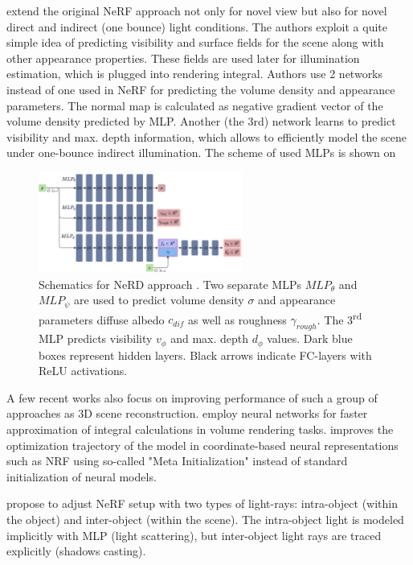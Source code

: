 \documentclass[english]{article}
\begin{document}
\cite{srinivasan2020nerv} extend the original NeRF approach not only for novel view but also for novel direct and indirect (one bounce) light conditions. The authors exploit a quite simple idea of predicting visibility and surface fields for the scene along with other appearance properties. These fields are used later for illumination estimation, which is plugged into rendering integral. Authors use 2 networks instead of one used in NeRF for predicting the volume density and appearance parameters. The normal map is calculated as negative gradient vector of the volume density predicted by MLP. Another (the 3rd) network learns to predict visibility and max. depth information, which allows to efficiently model the scene under one-bounce indirect illumination. The scheme of used MLPs is shown on 

\begin{figure}[t]
    \centering
    \includegraphics[width=0.6\textwidth]{img/mlp_nerv.png}
    \caption{Schematics for NeRD approach \cite{srinivasan2020nerv}. Two separate MLPs $MLP_\theta$ and $MLP_\psi$ are used to predict volume density $\sigma$ and appearance parameters diffuse albedo $c_{dif}$ as well as roughness $\gamma_{rough}$. The 3\textsuperscript{rd} MLP predicts visibility $v_\phi$ and max. depth $d_\phi$ values. Dark blue boxes represent hidden layers. Black arrows indicate FC-layers with ReLU activations.}
    \label{fig:mlp_nerv}
\end{figure}

A few recent works also focus on improving performance of such a group of approaches as 3D scene reconstruction. \cite{lindell2020autoint} employ neural networks for faster approximation of integral calculations in volume rendering tasks. \cite{tancik2020meta} improves the optimization trajectory of the model in coordinate-based neural representations such as NRF using so-called "Meta Initialization" instead of standard initialization of neural models.

\cite{guo2020osf} propose to adjust NeRF setup with two types of light-rays: intra-object (within the object) and inter-object (within the scene). The intra-object light is modeled implicitly with MLP (light scattering), but inter-object light rays are traced explicitly (shadows casting).
\end{document}
